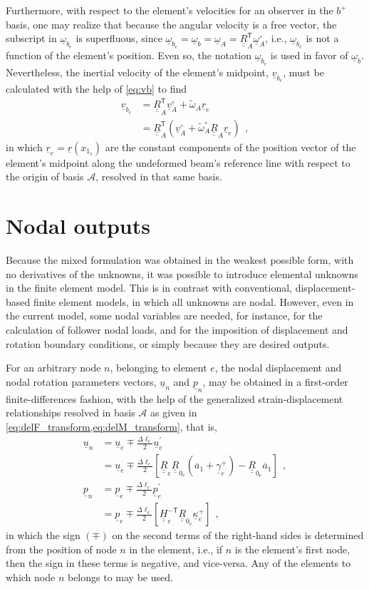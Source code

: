 \documentclass[12pt,a4paper,oneside,english]{abntex2} %
\newcommand{\vect}[1]{\underline{#1}}
\newcommand{\uvec}[1]{\overline{#1}}
\def\tens#1{\underline{\underline{#1}}}
\def\til#1{\widetilde{#1}}
\def\lb{\left[}
\def\rb{\right]}
\def\lp{\left(}
\def\rp{\right)}
\def\T{\mathsf{T}}
\def\A{\mathcal{A}}
\def\bp{b^+}
\def\aone{\uvec{a}_1}
\def\R{\tens{R}}
\def\RA{\R_A}
\def\RAT{\R^\T_A}
\def\r{\vect{r}}
\def\u{\vect{u}}
\def\vA{\vect{v}_A}
\def\vAo{\vA^{\circ}}
\def\om{\vect{\omega}_b}
\def\omA{\vect{\omega}_A}
\def\omAo{\omA^{\circ}}
\def\omAtil{\til{\omega}_A}
\def\omAtilo{\omAtil^{\circ}}
\def\gam{\vect{\gamma}}
\def\gamp{\gam^{+}}
\def\kap{\vect{\kappa}}
\def\kapp{\kap^{+}}
\def\H{\tens{H}}
\def\p{\vect{p}}
\def\Deltal{\Delta \ell_e}
\def\dlotwo{\frac{\Deltal}{2}}
\def\re{\r_e}
\def\vbe{\vect{v}_{b_e}}
\def\ombe{\vect{\omega}_{b_e}}
\def\ue{\u_e}
\def\uep{\vect{u}^{\prime}_e}
\def\pe{\p_e}
\def\pep{\vect{p}^{\prime}_e}
\def\gampe{\gamp_e}
\def\kappe{\kapp_e}
\def\HinvTe{\H^{-\T}_e}
\def\Re{\R_{e}}
\def\Rze{\R_{0_e}}
\def\xom{x_{1_e}}
\begin{document}
\begin{apendicesenv}
Furthermore, with respect to the element's velocities for an observer in the $\bp$ basis, one may realize that because the angular velocity is a free vector, the subscript in $\ombe$ is superfluous, since $\ombe = \om = \omA = \RAT\omAo $, i.e., $\ombe$ is not a function of the element's position. Even so, the notation $\ombe$ is used in favor of $\om$. Nevertheless, the inertial velocity of the element's midpoint, $\vbe$, must be calculated with the help of \cref{eq:vb} to find
\begin{align}
    \vbe &= \RAT\vAo + \omAtil\re
    \nonumber \\
    &= \RAT\lp\vAo+\omAtilo\RA\re\rp \ \ ,
    \label{eq:vbe}
\end{align}
in which $\re = \r\lp \xom \rp$ are the constant components of the position vector of the element's midpoint along the undeformed beam's reference line with respect to the origin of basis $\A$, resolved in that same basis.

\section{Nodal outputs}
\label{sec:nodal_out}

Because the mixed formulation was obtained in the weakest possible form, with no derivatives of the unknowns, it was possible to introduce elemental unknowns in the finite element model. This is in contrast with conventional, displacement-based finite element models, in which all unknowns are nodal. However, even in the current model, some nodal variables are needed, for instance, for the calculation of follower nodal loads, and for the imposition of displacement and rotation boundary conditions, or simply because they are desired outputs. 

For an arbitrary node $n$, belonging to element $e$, the nodal displacement and nodal rotation parameters vectors, $\u_n$ and $\p_n$, may be obtained in a first-order finite-differences fashion, with the help of the generalized strain-displacement relationships resolved in basis $\A$ as given in \cref{eq:delF_transform,eq:delM_transform}, that is,
\begin{align}
    \u_n &= \ue \mp \dlotwo\uep
    \nonumber \\
    &= \ue \mp \dlotwo\lb\Re\Rze\lp\aone+\gampe\rp-\Rze\aone\rb  \ \ ,
    \label{eq:un}
    \\
    \p_n &= \pe \mp \dlotwo\pep
    \nonumber \\
    &= \pe \mp \dlotwo\lb\HinvTe\Rze\kappe\rb \ \ ,
    \label{eq:pn}
\end{align}
in which the sign $(\mp)$ on the second terms of the right-hand sides is determined from the position of node $n$ in the element, i.e., if $n$ is the element's first node, then the sign in these terms is negative, and vice-versa. Any of the elements to which node $n$ belongs to may be used.


\end{apendicesenv}
\end{document}
